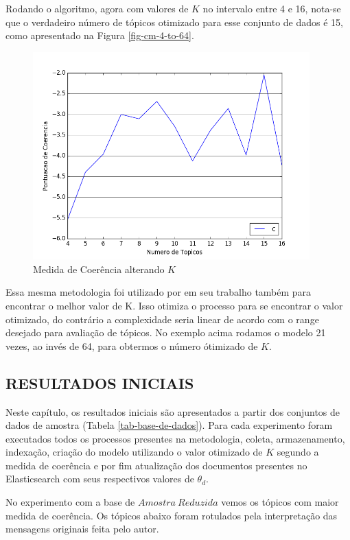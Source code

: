 \documentclass[12pt,a4paper]{article}
\begin{document}
Rodando o algoritmo, agora com valores de $K$ no intervalo entre 4 e 16, nota-se que o verdadeiro número de tópicos otimizado para esse 
 conjunto de dados é 15, como apresentado na Figura \ref{fig-cm-4-to-64}.

\begin{figure}[H]
	\centering
    \includegraphics[height=8cm]{images/figure_6.png}
    \caption{Medida de Coerência alterando $K$}
    \label{fig-cm-4-to-16}
\end{figure}

Essa mesma metodologia foi utilizado por  em seu trabalho também para encontrar o melhor valor de K. Isso otimiza
 o processo para se encontrar o valor otimizado, do contrário a complexidade seria linear de acordo com o range desejado para avaliação de
 tópicos. No exemplo acima rodamos o modelo 21 vezes, ao invés de 64, para obtermos o número ótimizado de $K$.

\subsection{RESULTADOS INICIAIS}

Neste capítulo, os resultados iniciais são apresentados a partir dos conjuntos de dados de amostra (Tabela \ref{tab-base-de-dados}).
 Para cada experimento foram executados todos os processos presentes na metodologia, coleta, armazenamento, indexação, criação do modelo utilizando o valor
 otimizado de $K$ segundo a medida de coerência e por fim atualização dos documentos presentes no Elasticsearch com seus respectivos valores de $\theta_d$.


No experimento com a base de $Amostra\ Reduzida$ vemos os tópicos com maior medida de coerência.
 Os tópicos abaixo foram rotulados pela interpretação das mensagens originais feita pelo autor.
\end{document}
